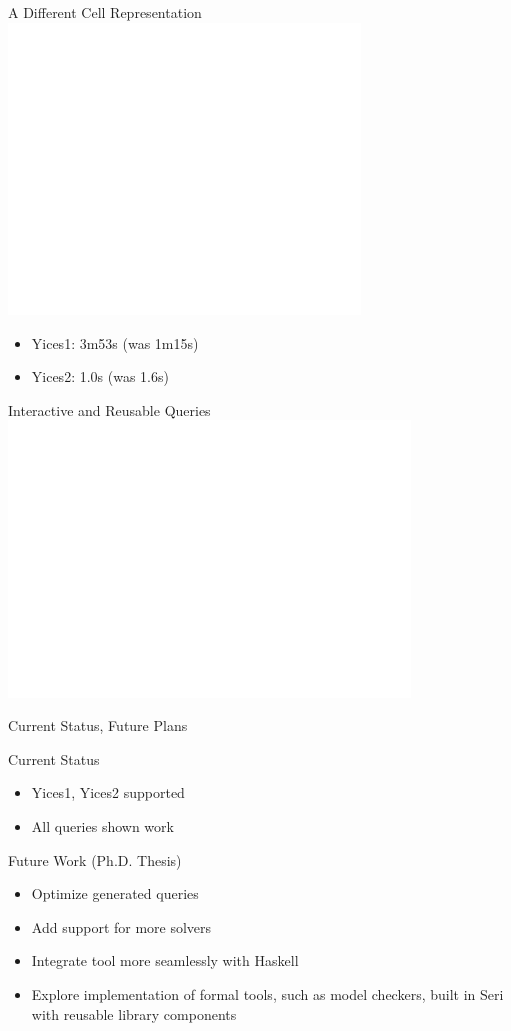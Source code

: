 \documentclass{beamer}
\begin{document}
\begin{frame}{A Different Cell Representation}
\includegraphics[width=0.7\textwidth]{bitcell7}
\begin{itemize}
\item Yices1: 3m53s (was 1m15s)
\item Yices2: 1.0s  (was 1.6s)
\end{itemize}
\end{frame}

\begin{frame}{Interactive and Reusable Queries}
\includegraphics[width=0.8\textwidth]{allq4}
\end{frame}

\begin{frame}{Current Status, Future Plans}
\begin{block}{Current Status}
    \begin{itemize}
        \item Yices1, Yices2 supported
        \item All queries shown work
    \end{itemize}
\end{block}
\begin{block}{Future Work (Ph.D. Thesis)}
    \begin{itemize}
        \item Optimize generated queries
        \item Add support for more solvers
        \item Integrate tool more seamlessly with Haskell
        \item Explore implementation of formal tools, such as model checkers,
              built in Seri with reusable library components
    \end{itemize}
\end{block}
\end{frame}
\end{document}
